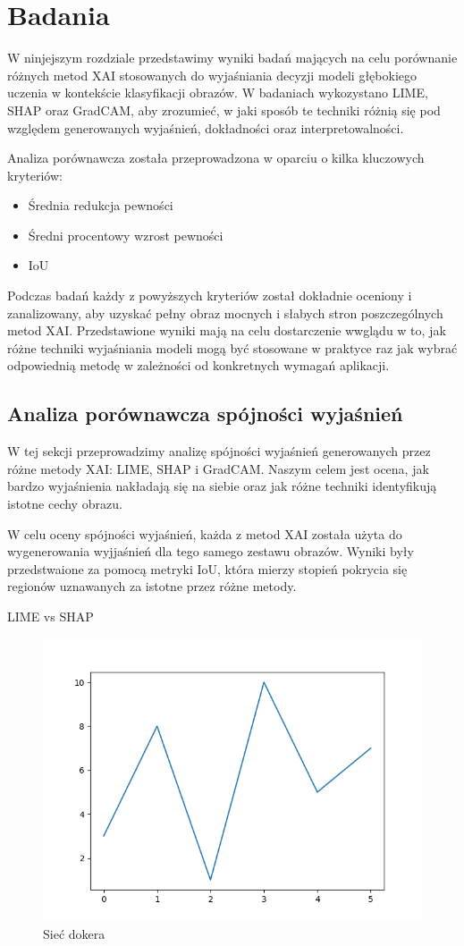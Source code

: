 
\chapter*{Badania}

W ninjejszym rozdziale przedstawimy wyniki badań mających na celu porównanie różnych metod XAI stosowanych do wyjaśniania decyzji modeli głębokiego uczenia w kontekście klasyfikacji obrazów.
W badaniach wykozystano LIME, SHAP oraz GradCAM, aby zrozumieć, w jaki sposób te techniki różnią się pod względem generowanych wyjaśnień, dokładności oraz interpretowalności.

Analiza porównawcza została przeprowadzona w oparciu o kilka kluczowych kryteriów:
\begin{itemize}
  \item Średnia redukcja pewności
  \item Średni procentowy wzrost pewności
  \item IoU
\end{itemize}
Podczas badań każdy z powyższych kryteriów został dokładnie oceniony i zanalizowany, aby uzyskać pełny obraz mocnych i słabych stron poszczególnych metod XAI.
Przedstawione wyniki mają na celu dostarczenie wwglądu w to, jak różne techniki wyjaśniania modeli mogą być stosowane w praktyce raz jak wybrać odpowiednią metodę w zależności od konkretnych wymagań aplikacji.

\section*{Analiza porównawcza spójności wyjaśnień}
W tej sekcji przeprowadzimy analizę spójności wyjaśnień generowanych przez różne metody XAI: LIME, SHAP i GradCAM.
Naszym celem jest ocena, jak bardzo wyjaśnienia nakładają się na siebie oraz jak różne techniki identyfikują istotne cechy obrazu.

W celu oceny spójności wyjaśnień, każda z metod XAI została użyta do wygenerowania wyjjaśnień dla tego samego zestawu obrazów.
Wyniki były przedstwaione za pomocą metryki IoU, która mierzy stopień pokrycia się regionów uznawanych za istotne przez różne metody.

LIME vs SHAP
\begin{figure}
  \centering\includegraphics[width=.6\textwidth]{images/example}
\caption{Sieć dokera \cite{docker_compose_reference}}  \label{rys:network}
\end{figure}

